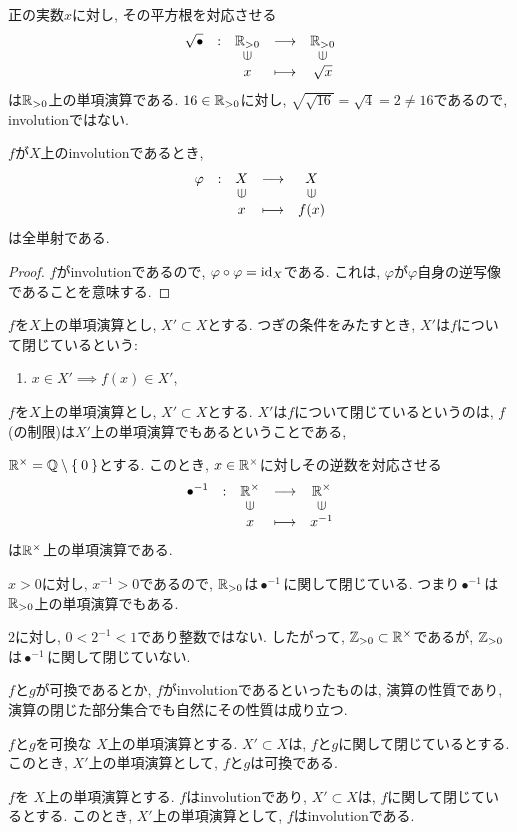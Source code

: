 \begin{example}
  正の実数$x$に対し, その平方根を対応させる
  \begin{align*}
    \shazo{\sqrt{\bullet}}
          {\RR_{>0}}{\RR_{>0}}
          {x}{\sqrt{x}}
  \end{align*}
  は$\mathbb{R}_{>0}$上の単項演算である.
  $16\in\mathbb{R}_{>0}$に対し,
  $\sqrt{\sqrt{16}}=\sqrt{4}=2\neq 16$であるので,
  involutionではない.
\end{example}
\begin{prop}
  $f$が$X$上のinvolutionであるとき,
  \begin{align*}
    \shazo{\varphi}
          {X}{X}
          {x}{f(x)}
  \end{align*}
  は全単射である.
\end{prop}
\begin{proof}
  $f$がinvolutionであるので, $\varphi\circ\varphi=\operatorname{id}_X$である.
  これは, $\varphi$が$\varphi$自身の逆写像であることを意味する.
\end{proof}
\begin{definition}
  $f$を$X$上の単項演算とし,
  $X'\subset X$とする.
  つぎの条件をみたすとき,
  $X'$は$f$について閉じているという:
  \begin{enumerate}
  \item $x\in X'\implies f(x)\in X'$,
  \end{enumerate}
\end{definition}
\begin{remark}
  $f$を$X$上の単項演算とし,
  $X'\subset X$とする.
  $X'$は$f$について閉じているというのは,
  $f$(の制限)は$X'$上の単項演算でもあるということである,
\end{remark}
\begin{example}
  $\mathbb{R}^\times = \mathbb{Q}\setminus\Set{0}$とする.
  このとき,
  $x\in\mathbb{R}^\times$に対しその逆数を対応させる
  \begin{align*}
    \shazo{\bullet^{-1}}
          {\RR^{\times}}{\RR^{\times}}
          {x}{x^{-1}}
  \end{align*}
  は$\mathbb{R}^\times$上の単項演算である.

  $x>0$に対し, $x^{-1}>0$であるので,
  $\mathbb{R}_{>0}$は$\bullet^{-1}$に関して閉じている.
  つまり$\bullet^{-1}$は$\mathbb{R}_{>0}$上の単項演算でもある.

  $2$に対し, $0<2^{-1}<1$であり整数ではない.
  したがって, $\mathbb{Z}_{>0}\subset \mathbb{R}^{\times}$であるが,
  $\mathbb{Z}_{>0}$は$\bullet^{-1}$に関して閉じていない.
\end{example}

$f$と$g$が可換であるとか,
$f$がinvolutionであるといったものは,
演算の性質であり,
演算の閉じた部分集合でも自然にその性質は成り立つ.
\begin{prop}
  $f$と$g$を可換な
  $X$上の単項演算とする.
  $X'\subset X$は, $f$と$g$に関して閉じているとする.
  このとき,
  $X'$上の単項演算として, $f$と$g$は可換である.
\end{prop}
\begin{prop}
  $f$を
  $X$上の単項演算とする.
  $f$はinvolutionであり,
  $X'\subset X$は, $f$に関して閉じているとする.
  このとき,
  $X'$上の単項演算として,
  $f$はinvolutionである.
\end{prop}



